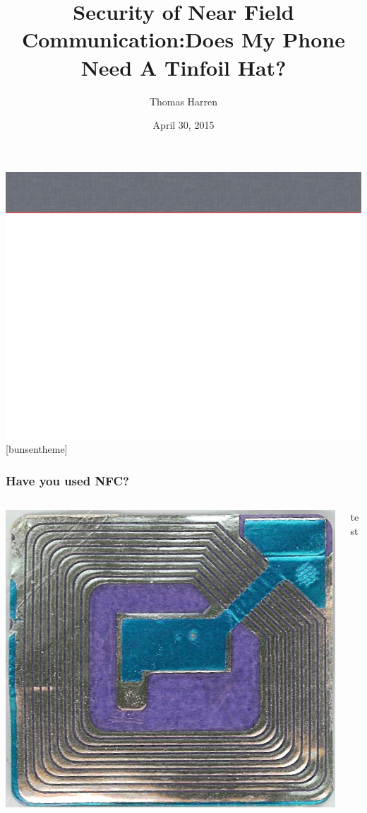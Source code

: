 \documentclass[unknownkeysallowed]{beamer}
\title{Security of Near Field Communication:\break Does My Phone Need A Tinfoil Hat?}
\author{Thomas Harren}
\institute[UMM] %
{
  University of Minnesota, Morris
}
\date[]{April 30, 2015}
\begin{document}
\begin{frame}
  \titlepage
\end{frame}

 {\includegraphics[width=\paperwidth,height=\paperheight]{slide_bg}}
[bunsentheme]


\begin{frame}
\frametitle{Have you used NFC?}
  \begin{columns}[T]
    \begin{column}{.5\textwidth}
  		\begin{block}{}
  		  \begin{center}
    		\includegraphics[scale=.5]{figures/wikimediatag.jpg}
    		\end{center}
    	\end{block}
    \end{column}
    \begin{column}{.5\textwidth}
        test
    \end{column}
  \end{columns}
\end{frame}
\end{document}
